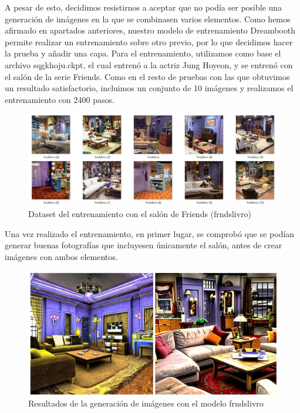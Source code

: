 A pesar de esto, decidimos resistirnos a aceptar que no podía ser posible una generación de imágenes en la que se combinasen varios elementos. Como hemos afirmado en apartados anteriores, nuestro modelo de entrenamiento Dreambooth permite realizar un entrenamiento sobre otro previo, por lo que decidimos hacer la prueba y añadir una capa. Para el entrenamiento, utilizamos como base el archivo sqgkhoju.ckpt, el cual entrenó a la actriz Jung Hoyeon, y se entrenó con el salón de la serie Friends. Como en el resto de pruebas con las que obtuvimos un resultado satisfactorio, incluimos un conjunto de 10 imágenes y realizamos el entrenamiento con 2400 pasos.\\

\begin{figure}[!htb]
	\centering
	\includegraphics[width = 1
	\textwidth]{Imagenes/Vectorial/dataset_frdslivro.png}
	\caption{Dataset del entrenamiento con el salón de Friends (frndslivro)}
	\label{fig:dataset_frdslivro}
\end{figure}


Una vez realizado el entrenamiento, en primer lugar, se comprobó que se podían generar buenas fotografías que incluyesen únicamente el salón, antes de crear imágenes con ambos elementos.\\

\begin{figure}[!htb]
	\centering
	\includegraphics[width = 1
	\textwidth]{Imagenes/Vectorial/resultadosfrndslivro.png}
	\caption{Resultados de la generación de imágenes con el modelo frndslivro}
	\label{fig:resultsfrnds}
\end{figure}

